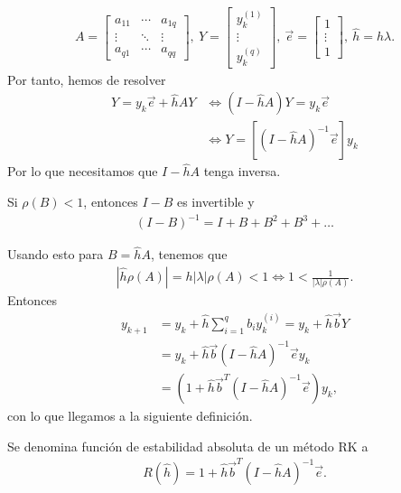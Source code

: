 \begin{align*}
    A = \begin{bmatrix}
            a_{11} & \cdots & a_{1q} \\
            \vdots & \ddots & \vdots \\
            a_{q1} & \cdots & a_{qq}
        \end{bmatrix}, \ Y = \begin{bmatrix}
                                 y_k^{(1)} \\
                                 \vdots    \\
                                 y_k^{(q)}
                             \end{bmatrix}, \ \overrightarrow{e}  = \begin{bmatrix}
                                                                        1      \\
                                                                        \vdots \\
                                                                        1
                                                                    \end{bmatrix}, \ \hat{h} = h\lambda.
\end{align*}
Por tanto, hemos de resolver
\begin{align*}
    Y = y_k \overrightarrow{e} + \hat{h} AY & \Longleftrightarrow (I -\hat{h}A)Y = y_k \overrightarrow{e}        \\
                                            & \Longleftrightarrow Y = [(I -\hat{h}A)^{-1} \overrightarrow{e}]y_k
\end{align*}
Por lo que necesitamos que $I - \hat{h}A$ tenga inversa.

\begin{obs}
    Si $\rho(B) < 1$, entonces $I - B$ es invertible y
    \begin{align*}
        (I-B)^{-1} = I + B +  B^2 + B^3 + \ldots
    \end{align*}
\end{obs}
Usando esto para $B = \hat{h}A$, tenemos que
\begin{align*}
    |\hat{h}\rho(A)| = h|\lambda|\rho(A) < 1 \Longleftrightarrow 1 < \frac{1}{|\lambda|\rho(A)}.
\end{align*}
Entonces
\begin{align*}
    y_{k+1} & = y_k + \hat{h} \sum_{i=1}^{q} b_i y_k^{(i)} = y_k + \hat{h}  \overrightarrow{b}Y \\
            & = y_k + \hat{h} \overrightarrow{b}(I - \hat{h}A)^{-1}\overrightarrow{e}y_k        \\
            & = (1 + \hat{h}\overrightarrow{b}^{T}(I - \hat{h}A)^{-1}\overrightarrow{e}) y_k,
\end{align*}
con lo que llegamos a la siguiente definición.
\begin{defi}
    Se denomina función de estabilidad absoluta de un método RK a
    \begin{align*}
        R(\hat{h}) = 1 + \hat{h}\overrightarrow{b}^{T}(I - \hat{h}A)^{-1}\overrightarrow{e}.
    \end{align*}
\end{defi}

